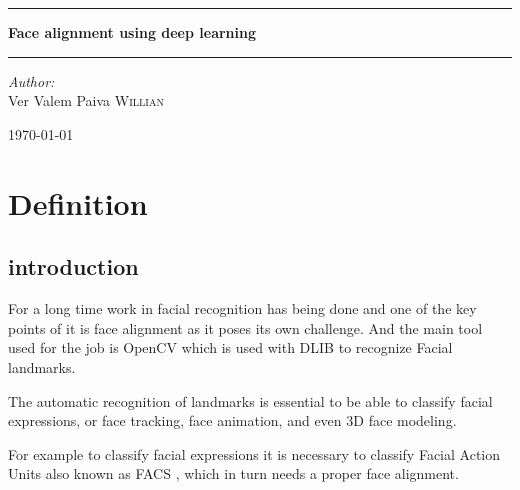 \documentclass[11pt]{article}
\date{}
\title{}
\begin{document}
\begin{titlepage}
\begin{center}


\textsc{\LARGE}\\[1.5cm]

\textsc{\Large}\\[0.5cm]


\vspace{1cm}
\hrule
\vspace{1cm}


{\huge \bfseries Face alignment using deep learning}


\vspace{1cm}
\hrule
\vspace{1cm}


\begin{minipage}{0.4\textwidth}
\emph{Author:} \\
Ver Valem Paiva \textsc{Willian}\\
\end{minipage}

\vfill

{\large \today}

\end{center}
\end{titlepage}


\tableofcontents
\newpage


\section{Definition}
\label{sec:org6fa9d3d}

\subsection{introduction}
\label{sec:org5235ca7}

For a long time work in facial recognition has being done and one of the key
points of it is face alignment as it poses its own challenge.
And the main tool used for the job is OpenCV which is used with DLIB to
recognize Facial landmarks.

The automatic recognition of landmarks is essential to be able to classify
facial expressions, or face tracking, face animation, and even 3D face
modeling.

For example to classify facial expressions it is necessary to classify
Facial Action Units also known as FACS \cite{ekman1977facial}, which in turn
needs a proper face alignment.
\end{document}
